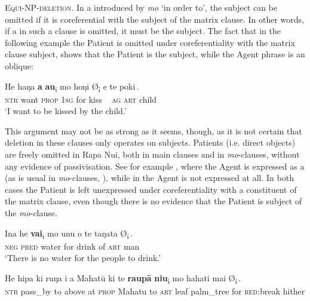 \textsc{Equi-NP-deletion.} In a  introduced by \textit{mo} ‘in order to’, the subject can be omitted if it is coreferential with the subject of the matrix clause. In other words, if a  in such a clause is omitted, it must be the subject. The fact that in the following example the Patient is omitted under coreferentiality with the matrix clause subject, shows that the Patient is the subject, while the Agent phrase is an oblique:

\ea\label{ex:8.48}
\gll He haŋa \textbf{a} \textbf{au}\textsubscript{\textup{i}} {\ob}mo hoŋi  \textup{Ø}\textsubscript{\textup{i}} e te poki\,{\cb}.\\
\textsc{ntr} want \textsc{prop} \textsc{1sg} {\db}for kiss ~ \textsc{ag} \textsc{art} child\\

\glt
‘I want to be kissed by the child.’  
\z

This argument may not be as strong as it seems, though, as it is not certain that deletion in these clauses only operates on subjects. Patients (i.e. direct objects) are freely omitted in Rapa Nui, both in main clauses and in \textit{mo}{}-clauses, without any evidence of passivisation. See for example , where the Agent is expressed as a  (as is usual in \textit{mo}{}-clauses, ), while in  the Agent is not expressed at all. In both cases the Patient is left unexpressed under coreferentiality with a constituent of the matrix clause, even though there is no evidence that the Patient is subject of the \textit{mo}{}-clause.

\ea\label{ex:8.49}
\gll {\ꞌ}Ina he \textbf{vai}\textsubscript{\textup{i}} {\ob}mo unu o te taŋata \textup{Ø}\textsubscript{\textup{i}}\,{\cb}.\\
\textsc{neg} \textsc{pred} water {\db}for drink of \textsc{art} man \\

\glt 
‘There is no water for the people to drink.’ \textstyleExampleref{[R372.013]} 
\z

\ea\label{ex:8.50}
\gll He hipa ki ruŋa i a Mahatū ki te \textbf{raupā} \textbf{niu}\textsubscript{\textup{i}}  {\ob}mo hahati mai \textup{Ø}\textsubscript{\textup{i}}\,{\cb}.\\
\textsc{ntr} pass\_by to above at \textsc{prop} Mahatu to \textsc{art} leaf palm\_tree {\db}for \textsc{red}:break hither \\

